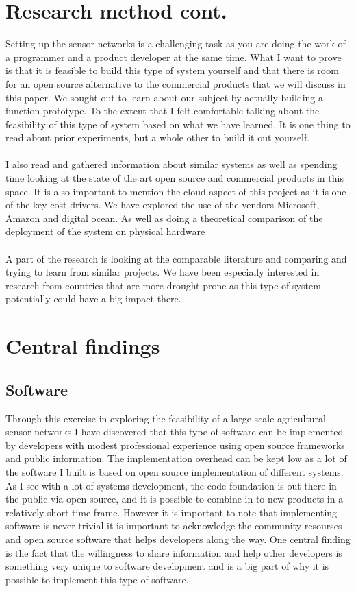 \documentclass[]{uiophd}
\begin{document}
\section{Research method cont.}
Setting up the sensor networks is a challenging task as you are doing the work of a programmer and a product developer at the same time. What I want to prove is that it is feasible to build this type of system yourself and that there is room for an open source alternative to the commercial products that we will discuss in this paper. We sought out to learn about our subject by actually building a function prototype. To the extent that I felt comfortable talking about the feasibility of this type of system based on what we have learned. It is one thing to read about prior experiments, but a whole other to build it out yourself.
\\\\
I also read and gathered information about similar systems as well as spending time looking at the state of the art open source and commercial products in this space. It is also important to mention the cloud aspect of this project as it is one of the key cost drivers. We have explored the use of the vendors Microsoft, Amazon and digital ocean. As well as doing a theoretical comparison of the deployment of the system on physical hardware
\\\\
A part of the research is looking at the comparable literature and comparing and trying to learn from similar projects. We have been especially interested in research from countries that are more drought prone as this type of system potentially could have a big impact there.

\section{Central findings}
\subsection{Software}
Through this exercise in exploring the feasibility of a large scale agricultural sensor networks I have discovered that this type of software can be implemented by developers with modest professional experience using open source frameworks and public information. The implementation overhead can be kept low as a lot of the software I built is based on open source implementation of different systems. As I see with a lot of systems development, the code-foundation is out there in the public via open source, and it is possible to combine in to new products in a relatively short time frame. However it is important to note that implementing software is never trivial it is important to acknowledge the community resourses and open source software that helps developers along the way. One central finding is the fact that the willingness to share information and help other developers is something very unique to software development and is a big part of why it is possible to implement this type of software.
\end{document}
